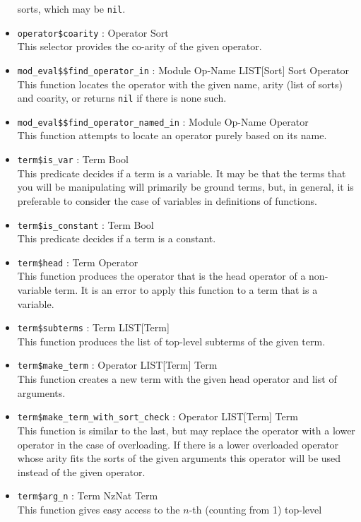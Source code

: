 \begin{itemize}
sorts, which may be {\tt nil}.
\item {\tt operator\$coarity} : Operator \ra Sort\\
This selector provides the co-arity of the given operator.
\item {\tt mod\_eval\$\$find\_operator\_in} : Module Op-Name LIST[Sort] Sort \ra Operator\\
This function locates the operator with the given name, arity (list of
sorts) and coarity, or returns {\tt nil} if there is none such.
\item {\tt mod\_eval\$\$find\_operator\_named\_in} : Module Op-Name \ra Operator\\
This function attempts to locate an operator purely based on its name.
\item {\tt term\$is\_var} : Term \ra Bool\\
This predicate decides if a term is a variable.  It may be that the
terms that you will be manipulating will primarily be ground terms,
but, in general, it is preferable to consider the case of
variables in definitions of functions.
\item {\tt term\$is\_constant} : Term \ra Bool\\
This predicate decides if a term is a constant.
\item {\tt term\$head} : Term \ra Operator\\
This function produces the operator that is the head operator of a
non-variable term.  It is an error to apply this function to a term
that is a variable.
\item {\tt term\$subterms} : Term \ra LIST[Term]\\
This function produces the list of top-level subterms of the given term.
\item {\tt term\$make\_term} : Operator LIST[Term] \ra Term\\
This function creates a new term with the given head operator and list
of arguments.
\item {\tt term\$make\_term\_with\_sort\_check} : Operator LIST[Term] \ra Term\\
This function is similar to the last, but may replace the operator
with a lower operator in the case of overloading.  If there is a lower
overloaded operator whose arity fits the sorts of the given arguments
this operator will be used instead of the given operator.
\item {\tt term\$arg\_n} : Term NzNat \ra Term\\
This function gives easy access to the $n$-th (counting from 1) top-level

\end{itemize}
